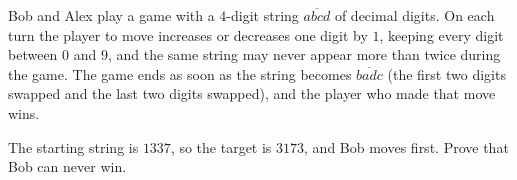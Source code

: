 Bob and Alex play a game with a $4$-digit string $\overline{abcd}$ of decimal digits. On each turn the player to move increases or decreases one digit by $1$, keeping every digit between $0$ and $9$, and the same string may never appear more than twice during the game. The game ends as soon as the string becomes $\overline{badc}$ (the first two digits swapped and the last two digits swapped), and the player who made that move wins.

The starting string is $1337$, so the target is $3173$, and Bob moves first. Prove that Bob can never win.

